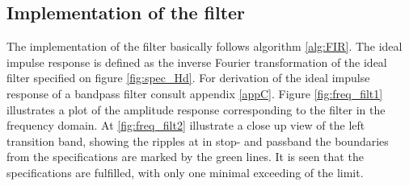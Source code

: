 \subsection{Implementation of the filter}
The implementation of the filter basically follows algorithm \ref{alg:FIR}. The ideal impulse response is defined as the inverse Fourier transformation of the ideal filter specified on figure \ref{fig:spec_Hd}. For derivation of the ideal impulse response of a bandpass filter consult appendix \ref{appC}. Figure \ref{fig:freq_filt1} illustrates a plot of the amplitude response corresponding to the filter in the frequency domain. At \ref{fig:freq_filt2} illustrate a close up view of the left transition band, showing the ripples at in stop- and passband  the boundaries from the specifications are marked by the green lines. It is seen that the specifications are fulfilled, with only one minimal exceeding of the limit.        
